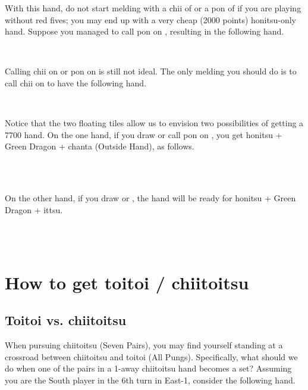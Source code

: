 \bigskip
\noindent With this hand, do not start melding with a {\jap chii} of {\LARGE{}} or a {\jap pon} of {\LARGE\bei} if you are playing without red fives; you may end up with a very cheap (2000 points) {\jap honitsu}-only hand. 
Suppose you managed to call {\jap pon} on {\LARGE\fa}, resulting in the following hand. 

\bp
{}\xi\bei\bei~\fa\rfa\fa
\ep

\noindent Calling {\jap chii} on {\LARGE{}} or {\jap pon} on {\LARGE\bei} is still not ideal. The only melding you should do is to call {\jap chii} on {\LARGE{}} to have the following hand.

\bp
{}\xi\bei\bei~~\fa\rfa\fa
\ep

Notice that the two floating tiles {\LARGE{} \xi} allow us to envision two possibilities of getting a 7700 hand. 
On the one hand, if you draw {\LARGE\xi} or call {\jap pon} on {\LARGE\bei}, you get {\jap honitsu} + Green Dragon + {\jap chanta} (Outside Hand), as follows.

\bp
{}\xi\xi\bei\bei~~\fa\rfa\fa\\
\xi~\bei\bei\rbei~~\fa\rfa\fa
\ep

On the other hand, if you draw {\LARGE{}} or {\LARGE{}}, the hand will be ready for {\jap honitsu} + Green Dragon + {\jap ittsu}. 

\bp
{}\bei\bei~~\fa\rfa\fa\\
\bei\bei~~\fa\rfa\fa
\ep

\newpage
\section{How to get {\jap toitoi} / {\jap chiitoitsu}} \label{sec:toi}

\subsection{{\jap Toitoi} vs. {\jap chiitoitsu}}
When pursuing {\jap chiitoitsu} (Seven Pairs), you may find yourself standing at a crossroad between {\jap chiitoitsu} and {\jap toitoi} (All Pungs). Specifically, what should we do when one of the pairs in a 1-away {\jap chiitoitsu} hand becomes a set? Assuming you are the South player in the 6th turn in East-1, consider the following hand. 

